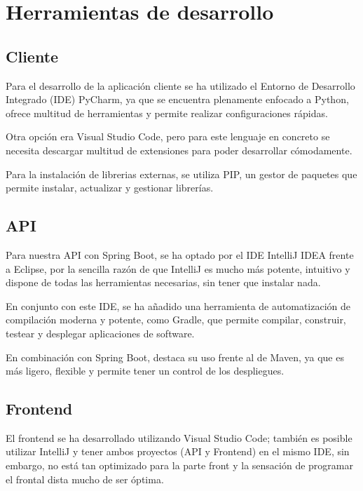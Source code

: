 \section{Herramientas de desarrollo}\label{sec:desarrollo}

\subsection{Cliente}\label{subsec:desarrollo_cliente}

Para el desarrollo de la aplicación cliente se ha utilizado el Entorno de Desarrollo Integrado (IDE) PyCharm\cite{pycharm:official},
ya que se encuentra plenamente enfocado a Python, ofrece multitud de herramientas y permite realizar configuraciones rápidas.

Otra opción era Visual Studio Code, pero para este lenguaje en concreto se necesita descargar multitud de extensiones
para poder desarrollar cómodamente.

Para la instalación de librerias externas, se utiliza PIP\cite{pip:official}, un gestor de paquetes que permite
instalar, actualizar y gestionar librerías.

\subsection{API}\label{subsec:desarrollo_api}

Para nuestra API con Spring Boot, se ha optado por el IDE IntelliJ IDEA\cite{intellij:official} frente a Eclipse,
por la sencilla razón de que IntelliJ es mucho más potente, intuitivo y dispone de todas las herramientas necesarias,
sin tener que instalar nada.

En conjunto con este IDE, se ha añadido una herramienta de automatización de compilación moderna y potente, como
Gradle\cite{gradle:official}, que permite compilar, construir, testear y desplegar aplicaciones de software.

En combinación con Spring Boot, destaca su uso frente al de Maven, ya que es más ligero, flexible y permite tener un control de
los despliegues.

\subsection{Frontend}\label{subsec:desarrollo_frontend}

El frontend se ha desarrollado utilizando Visual Studio Code\cite{vscode:official}; también es posible utilizar IntelliJ y tener ambos
proyectos (API y Frontend) en el mismo IDE, sin embargo, no está tan optimizado para la parte front y la sensación de
programar el frontal dista mucho de ser óptima.

